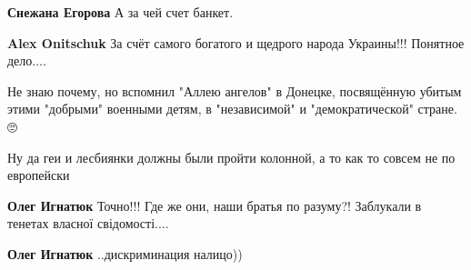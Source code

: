 \begin{itemize}
\begin{itemize}
\textbf{Снежана Егорова} А за чей счет банкет.


 
\textbf{Alex Onitschuk} За счёт самого богатого и щедрого народа Украины!!!
Понятное дело....
\end{itemize}

 

Не знаю почему, но вспомнил "Аллею ангелов" в Донецке, посвящённую убитым этими
"добрыми" военными детям, в "независимой" и "демократической" стране. 🙄


 

Ну да геи и лесбиянки должны были пройти колонной, а то как то совсем не по
европейски

\begin{itemize}
 
\textbf{Олег Игнатюк} Точно!!!
Где же они, наши братья по разуму?!
Заблукали в тенетах власної свідомості....

 
\textbf{Олег Игнатюк} ..дискриминация налицо))

 

\end{itemize}
\end{itemize}
